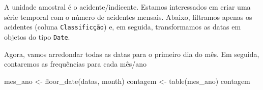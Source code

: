 \documentclass[
  letterpaper,
  DIV=11,
  numbers=noendperiod]{scrartcl}
\newenvironment{Shaded}{\begin{snugshade}}{\end{snugshade}}
\newcommand{\FunctionTok}[1]{\textcolor[rgb]{0.28,0.35,0.67}{#1}}
\newcommand{\NormalTok}[1]{\textcolor[rgb]{0.00,0.23,0.31}{#1}}
\newcommand{\OtherTok}[1]{\textcolor[rgb]{0.00,0.23,0.31}{#1}}
\newcommand{\SpecialCharTok}[1]{\textcolor[rgb]{0.37,0.37,0.37}{#1}}
\newcommand{\StringTok}[1]{\textcolor[rgb]{0.13,0.47,0.30}{#1}}
\theoremstyle{definition}
\theoremstyle{definition}
\theoremstyle{plain}
\theoremstyle{plain}
\theoremstyle{remark}
\begin{document}
A unidade amostral é o acidente/indicente. Estamos interessados em criar
uma série temporal com o número de acidentes mensais. Abaixo, filtramos
apenas os acidentes (coluna \texttt{Classificção}) e, em seguida,
transformamos as datas em objetos do tipo \texttt{Date}.

\begin{Shaded}
\end{Shaded}

Agora, vamos arredondar todas as datas para o primeiro dia do mês. Em
seguida, contaremos as frequências para cada mês/ano

\begin{Shaded}
\begin{Highlighting}[]
\NormalTok{mes\_ano }\OtherTok{\textless{}{-}} \FunctionTok{floor\_date}\NormalTok{(datas, }\StringTok{\textquotesingle{}month\textquotesingle{}}\NormalTok{)}
\NormalTok{contagem }\OtherTok{\textless{}{-}} \FunctionTok{table}\NormalTok{(mes\_ano)}
\NormalTok{contagem}
\end{Highlighting}
\end{Shaded}
\end{document}
